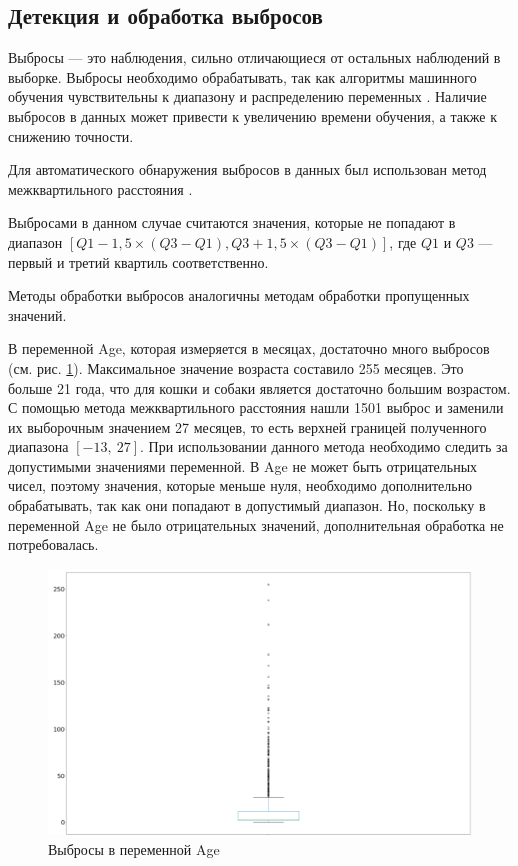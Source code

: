 \documentclass[14pt]{mmcs_article}
\begin{document}
\subsection{Детекция и обработка выбросов}

Выбросы — это наблюдения, сильно отличающиеся от остальных наблюдений в выборке. Выбросы необходимо обрабатывать, так как алгоритмы машинного обучения чувствительны к диапазону и распределению переменных \cite{lib:outlier}. Наличие выбросов в данных может привести к увеличению времени обучения, а также к снижению точности.

Для автоматического обнаружения выбросов в данных был использован метод межквартильного расстояния \cite{lib:outlier2}. 

Выбросами в данном случае считаются значения, которые не попадают в диапазон $[Q1 - 1,5 \times (Q3 - Q1), Q3 + 1,5 \times (Q3 - Q1)]$, где $Q1$ и $Q3$ --- первый и третий квартиль соответственно.

Методы обработки выбросов аналогичны методам обработки пропущенных значений. 

В переменной Age, которая измеряется в месяцах, достаточно много выбросов (см. рис. \ref{analyse:ageoutlier}). Максимальное значение возраста составило 255 месяцев. Это больше 21 года, что для кошки и собаки является достаточно большим возрастом. С помощью метода межквартильного расстояния нашли 1501 выброс и заменили их выборочным значением 27 месяцев, то есть верхней границей полученного диапазона $[-13,\ 27]$. При использовании данного метода необходимо следить за допустимыми значениями переменной. В Age не может быть отрицательных чисел, поэтому значения, которые меньше нуля, необходимо дополнительно обрабатывать, так как они попадают в допустимый диапазон. Но, поскольку в переменной Age не было отрицательных значений, дополнительная обработка не потребовалась.

\begin{figure}[H]
	\centering
	\includegraphics[scale=0.7]{ageoutlier.png}
	\caption{Выбросы в переменной Age}\label{analyse:ageoutlier}
\end{figure}
\end{document}
